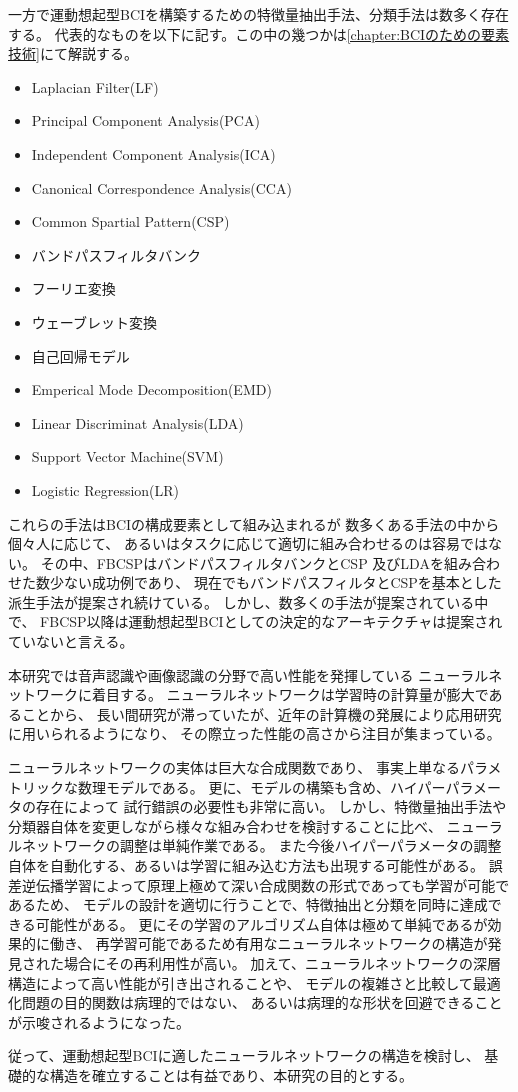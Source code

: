 一方で運動想起型BCIを構築するための特徴量抽出手法、分類手法は数多く存在する。
代表的なものを以下に記す。この中の幾つかは\ref{chapter:BCIのための要素技術}にて解説する。
\begin{itemize}
    \item Laplacian Filter(LF)
    \item Principal Component Analysis(PCA)
    \item Independent Component Analysis(ICA)
    \item Canonical Correspondence Analysis(CCA)
    \item Common Spartial Pattern(CSP)
    \item バンドパスフィルタバンク
    \item フーリエ変換
    \item ウェーブレット変換
    \item 自己回帰モデル
    \item Emperical Mode Decomposition(EMD)
    \item Linear Discriminat Analysis(LDA)
    \item Support Vector Machine(SVM)
    \item Logistic Regression(LR)
\end{itemize}
これらの手法はBCIの構成要素として組み込まれるが
数多くある手法の中から個々人に応じて、
あるいはタスクに応じて適切に組み合わせるのは容易ではない。
その中、FBCSPはバンドパスフィルタバンクとCSP
及びLDAを組み合わせた数少ない成功例であり、
現在でもバンドパスフィルタとCSPを基本とした派生手法が提案され続けている\cite{sparsemethod,bootCSP}。
しかし、数多くの手法が提案されている中で、
FBCSP以降は運動想起型BCIとしての決定的なアーキテクチャは提案されていないと言える。

本研究では音声認識や画像認識の分野で高い性能を発揮している
ニューラルネットワークに着目する。
ニューラルネットワークは学習時の計算量が膨大であることから、
長い間研究が滞っていたが、近年の計算機の発展により応用研究に用いられるようになり、
その際立った性能の高さから注目が集まっている。

ニューラルネットワークの実体は巨大な合成関数であり、
事実上単なるパラメトリックな数理モデルである。
更に、モデルの構築も含め、ハイパーパラメータの存在によって
試行錯誤の必要性も非常に高い。
しかし、特徴量抽出手法や分類器自体を変更しながら様々な組み合わせを検討することに比べ、
ニューラルネットワークの調整は単純作業である。
また今後ハイパーパラメータの調整自体を自動化する、あるいは学習に組み込む方法も出現する可能性がある。
誤差逆伝播学習によって原理上極めて深い合成関数の形式であっても学習が可能であるため、
モデルの設計を適切に行うことで、特徴抽出と分類を同時に達成できる可能性がある。
更にその学習のアルゴリズム自体は極めて単純であるが効果的に働き\cite{CheapLearning}、
再学習可能であるため有用なニューラルネットワークの構造が発見された場合にその再利用性が高い。
加えて、ニューラルネットワークの深層構造によって高い性能が引き出されること\cite{DeepvsShallow}や、
モデルの複雑さと比較して最適化問題の目的関数は病理的ではない、
あるいは病理的な形状を回避できることが示唆されるようになった\cite{ディープローカルミニマム}。

従って、運動想起型BCIに適したニューラルネットワークの構造を検討し、
基礎的な構造を確立することは有益であり、本研究の目的とする。
